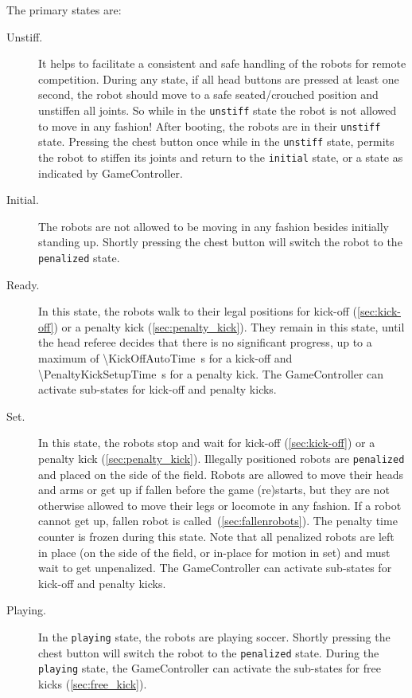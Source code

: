 The primary states are:
\begin{description}
  \item[Unstiff.] It helps to facilitate a consistent and safe handling of the robots for remote competition.
    During any state, if all head buttons are pressed at least one second, the robot should move to a safe seated/crouched position and unstiffen all joints.
    So while in the \texttt{unstiff} state the robot is not allowed to move in any fashion! After booting, the robots are in their \texttt{unstiff} state.
    Pressing the chest button once while in the \texttt{unstiff} state, permits the robot to stiffen its joints and return to the \texttt{initial} state, or a state as indicated by GameController.

  \item[Initial.] The robots are not allowed to be moving in any fashion besides initially standing up.
    Shortly pressing the chest button will switch the robot to the \texttt{penalized} state.

  \item[Ready.] In this state, the robots walk to their legal positions for kick-off (\cf \cref{sec:kick-off}) or a penalty kick (\cf \cref{sec:penalty_kick}).
    They remain in this state, until the head referee decides that there is no significant progress, up to a maximum of \qty{\KickOffAutoTime}{\second} for a kick-off and \qty{\PenaltyKickSetupTime}{\second} for a penalty kick.
    The GameController can activate sub-states for kick-off and penalty kicks.

  \item[Set.] In this state, the robots stop and wait for kick-off (\cf \cref{sec:kick-off}) or a penalty kick (\cf \cref{sec:penalty_kick}).
    Illegally positioned robots are \texttt{penalized} and placed on the side of the field.
    Robots are allowed to move their heads and arms or get up if fallen before the game (re)starts, but they are not otherwise allowed to move their legs or locomote in any fashion.
    If a robot cannot get up, fallen robot is called~(\cf \cref{sec:fallenrobots}).
    The penalty time counter is frozen during this state.
    Note that all penalized robots are left in place (on the side of the field, or in-place for motion in set) and must wait to get unpenalized.
    The GameController can activate sub-states for kick-off and penalty kicks.

  \item[Playing.] In the \texttt{playing} state, the robots are playing soccer.
    Shortly pressing the chest button will switch the robot to the \texttt{penalized} state.
    During the \texttt{playing} state, the GameController can activate the sub-states for free kicks (\cf \cref{sec:free_kick}).


\end{description}
